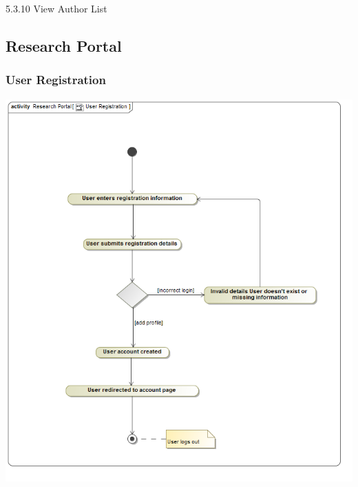 \documentclass[hidelinks,a4paper,12pt]{article}
\begin{document}
		
		5.3.10 View Author List
		
		\subsection{Research Portal}
	
		\subsubsection{User Registration}
			\includegraphics[width=1\textwidth]{./Graphs/UserRegistration.png}\\[0.4cm]
		
\end{document}
